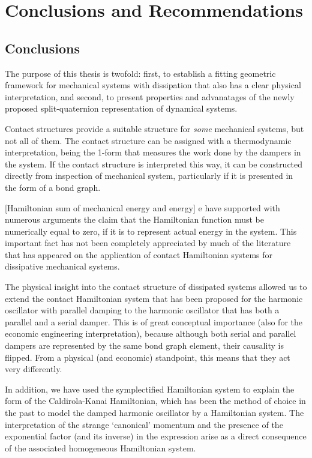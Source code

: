 \chapter{Conclusions and Recommendations}
\label{chap:conclusion}

\section*{Conclusions}
The purpose of this thesis is twofold: first, to establish a fitting geometric framework for mechanical systems with dissipation that also has a clear physical interpretation, and second, to present properties and advanatages of the newly proposed split-quaternion representation of dynamical systems. 

Contact structures provide a suitable structure for \emph{some} mechanical systems, but not all of them. The contact structure can be assigned with a thermodynamic interpretation, being the 1-form that measures the work done by the dampers in the system. If the contact structure is interpreted this way, it can be constructed  directly from inspection of mechanical system, particularly if it is presented in the form of a bond graph. 

[Hamiltonian sum of mechanical energy and energy] e have supported with numerous arguments the claim that the Hamiltonian function must be numerically equal to zero, if it is to represent actual energy in the system. This important fact has not been completely appreciated by much of the literature that has appeared on the application of contact Hamiltonian systems for dissipative mechanical systems.

The physical insight into the contact structure of dissipated systems allowed us to extend the contact Hamiltonian system that has been proposed for the harmonic oscillator with parallel damping to the harmonic oscillator that has both a parallel and a serial damper. This is of great conceptual importance (also for the economic engineering interpretation), because although both serial and parallel dampers are represented by the same bond graph element, their causality is flipped. From a physical (and economic) standpoint, this means that they act very differently.

In addition, we have used the symplectified Hamiltonian system to explain the form of the Caldirola-Kanai Hamiltonian, which has been the method of choice in the past to model the damped harmonic oscillator by a Hamiltonian system. The interpretation of the strange `canonical' momentum and the presence of the exponential factor (and its inverse) in the expression arise as a direct consequence of the associated homogeneous Hamiltonian system.

